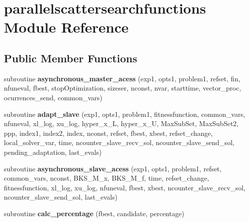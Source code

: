 \hypertarget{classparallelscattersearchfunctions}{\section{parallelscattersearchfunctions Module Reference}
\label{classparallelscattersearchfunctions}
}
\subsection*{Public Member Functions}
\begin{DoxyCompactItemize}
\item 
\hypertarget{classparallelscattersearchfunctions_ac623fb935e52f3b5387460e8b2e6e3be}{subroutine {\bfseries asynchronous\-\_\-master\-\_\-acess} (exp1, opts1, problem1, refset, fin, nfuneval, fbest, stop\-Optimization, sizeser, nconst, nvar, starttime, vector\-\_\-proc, ocurrences\-\_\-send, common\-\_\-vars)}\label{classparallelscattersearchfunctions_ac623fb935e52f3b5387460e8b2e6e3be}

\item 
\hypertarget{classparallelscattersearchfunctions_af0201bc9685c5d308330e77e3264b1bb}{subroutine {\bfseries adapt\-\_\-slave} (exp1, opts1, problem1, fitnessfunction, common\-\_\-vars, nfuneval, xl\-\_\-log, xu\-\_\-log, hyper\-\_\-x\-\_\-\-L, hyper\-\_\-x\-\_\-\-U, Max\-Sub\-Set, Max\-Sub\-Set2, ppp, index1, index2, index, nconst, refset, fbest, xbest, refset\-\_\-change, local\-\_\-solver\-\_\-var, time, ncounter\-\_\-slave\-\_\-recv\-\_\-sol, ncounter\-\_\-slave\-\_\-send\-\_\-sol, pending\-\_\-adaptation, last\-\_\-evals)}\label{classparallelscattersearchfunctions_af0201bc9685c5d308330e77e3264b1bb}

\item 
\hypertarget{classparallelscattersearchfunctions_a2cea1ab07f15a4a20fd27c40588beb34}{subroutine {\bfseries asynchronous\-\_\-slave\-\_\-acess} (exp1, opts1, problem1, refset, common\-\_\-vars, nconst, B\-K\-S\-\_\-\-M\-\_\-x, B\-K\-S\-\_\-\-M\-\_\-f, time, refset\-\_\-change, fitnessfunction, xl\-\_\-log, xu\-\_\-log, nfuneval, fbest, xbest, ncounter\-\_\-slave\-\_\-recv\-\_\-sol, ncounter\-\_\-slave\-\_\-send\-\_\-sol, last\-\_\-evals)}\label{classparallelscattersearchfunctions_a2cea1ab07f15a4a20fd27c40588beb34}

\item 
\hypertarget{classparallelscattersearchfunctions_a8d2879872760ed0fbefce438dbf2f38a}{subroutine {\bfseries calc\-\_\-percentage} (fbest, candidate, percentage)}\label{classparallelscattersearchfunctions_a8d2879872760ed0fbefce438dbf2f38a}


\end{DoxyCompactItemize}
